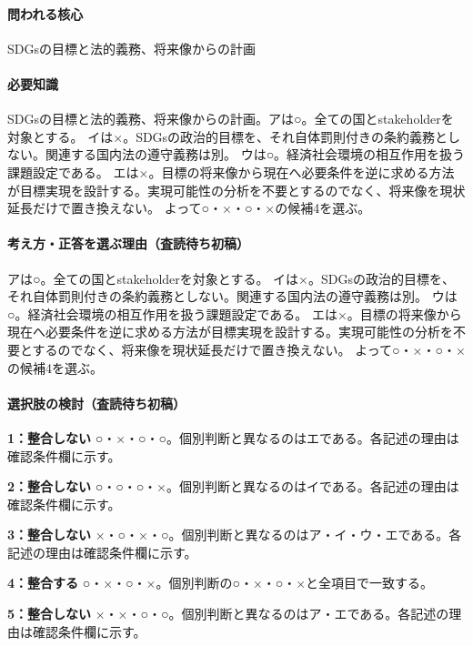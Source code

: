 \paragraph{問われる核心} SDGsの目標と法的義務、将来像からの計画

\paragraph{必要知識} SDGsの目標と法的義務、将来像からの計画。アは○。全ての国とstakeholderを対象とする。 イは×。SDGsの政治的目標を、それ自体罰則付きの条約義務としない。関連する国内法の遵守義務は別。 ウは○。経済社会環境の相互作用を扱う課題設定である。 エは×。目標の将来像から現在へ必要条件を逆に求める方法が目標実現を設計する。実現可能性の分析を不要とするのでなく、将来像を現状延長だけで置き換えない。 よって○・×・○・×の候補4を選ぶ。

\paragraph{考え方・正答を選ぶ理由（査読待ち初稿）} アは○。全ての国とstakeholderを対象とする。 イは×。SDGsの政治的目標を、それ自体罰則付きの条約義務としない。関連する国内法の遵守義務は別。 ウは○。経済社会環境の相互作用を扱う課題設定である。 エは×。目標の将来像から現在へ必要条件を逆に求める方法が目標実現を設計する。実現可能性の分析を不要とするのでなく、将来像を現状延長だけで置き換えない。 よって○・×・○・×の候補4を選ぶ。

\paragraph{選択肢の検討（査読待ち初稿）}\mbox{}\par

\noindent\textbf{1：整合しない} ○・×・○・○。個別判断と異なるのはエである。各記述の理由は確認条件欄に示す。\par

\noindent\textbf{2：整合しない} ○・○・○・×。個別判断と異なるのはイである。各記述の理由は確認条件欄に示す。\par

\noindent\textbf{3：整合しない} ×・○・×・○。個別判断と異なるのはア・イ・ウ・エである。各記述の理由は確認条件欄に示す。\par

\noindent\textbf{4：整合する} ○・×・○・×。個別判断の○・×・○・×と全項目で一致する。\par

\noindent\textbf{5：整合しない} ×・×・○・○。個別判断と異なるのはア・エである。各記述の理由は確認条件欄に示す。\par

